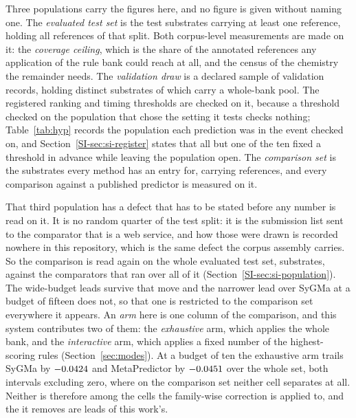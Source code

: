 Three populations carry the figures here, and no figure is given without naming one. The
\emph{evaluated test set} is the \numPopulationTestsubs{} test substrates carrying at least one
reference, holding all \numPopulationTestrefs{} references of that split. Both corpus-level
measurements are made on it: the \emph{coverage ceiling}, which is the share of the annotated
references any application of the rule bank could reach at all, and the census of the chemistry the
remainder needs. The \emph{validation draw} is a declared sample of \numValdrawCap{} validation records, holding \numValdrawDeclared{} distinct substrates of which \numValdrawPaired{} carry a whole-bank pool. The registered ranking and timing thresholds are checked on it, because a threshold checked on the population that chose the setting it tests checks nothing; Table~\ref{tab:hyp} records the population each prediction was in the event checked on, and Section~\ref{SI-sec:si-register} states that all but one of the ten fixed a threshold in advance while leaving the population open. The
\emph{comparison set} is the \numPopulationN{} substrates every method has an entry for, carrying
\numPopulationReferences{} references, and every comparison against a published predictor is
measured on it.

That third population has a defect that has to be stated before any number is read on it. It is no
random quarter of the test split: it is the submission list sent to the comparator that is a web
service, and how those \numPopulationN{} were drawn is recorded nowhere in this repository, which
is the same defect the corpus assembly carries. So the comparison is read again on the whole
evaluated test set, \numPopdefWholesubstrates{} substrates, against the
\numPopdefWholearmsWord{} comparators that ran over all of it
(Section~\ref{SI-sec:si-population}). The wide-budget leads survive that move and the narrower lead
over SyGMa at a budget of fifteen does not, so that one is restricted to the comparison set everywhere
it appears. An \emph{arm} here is one column of the comparison, and
this system contributes two of them: the \emph{exhaustive} arm, which applies the whole bank, and
the \emph{interactive} arm, which applies a fixed number of the highest-scoring rules
(Section~\ref{sec:modes}). At a budget of ten the exhaustive arm trails SyGMa by
$-0.0424$ and MetaPredictor by
$-0.0451$ over the whole set, both intervals excluding zero, where on
the comparison set neither cell separates at all. Neither is therefore among the
\numHolmSeparating{} cells the family-wise correction is applied to, and the
\numHolmLeadsremovedWord{} it removes are leads of this work's.

